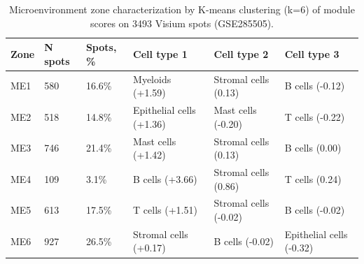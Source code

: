 \begin{table}[htbp]
\centering
\caption{Microenvironment zone characterization by K-means clustering (k=6) of module scores on 3493 Visium spots (GSE285505).}\label{tab:me_zones}
\small
\begin{tabular}{llllll}
\toprule
  Zone & N spots & Spots, \% & Cell type 1 & Cell type 2 & Cell type 3 \\
\midrule
  ME1 & 580 & 16.6\% & Myeloids (+1.59) & Stromal cells (0.13) & B cells (-0.12) \\
  ME2 & 518 & 14.8\% & Epithelial cells (+1.36) & Mast cells (-0.20) & T cells (-0.22) \\
  ME3 & 746 & 21.4\% & Mast cells (+1.42) & Stromal cells (0.13) & B cells (0.00) \\
  ME4 & 109 & 3.1\% & B cells (+3.66) & Stromal cells (0.86) & T cells (0.24) \\
  ME5 & 613 & 17.5\% & T cells (+1.51) & Stromal cells (-0.02) & B cells (-0.02) \\
  ME6 & 927 & 26.5\% & Stromal cells (+0.17) & B cells (-0.02) & Epithelial cells (-0.32) \\
\bottomrule
\end{tabular}
\end{table}
